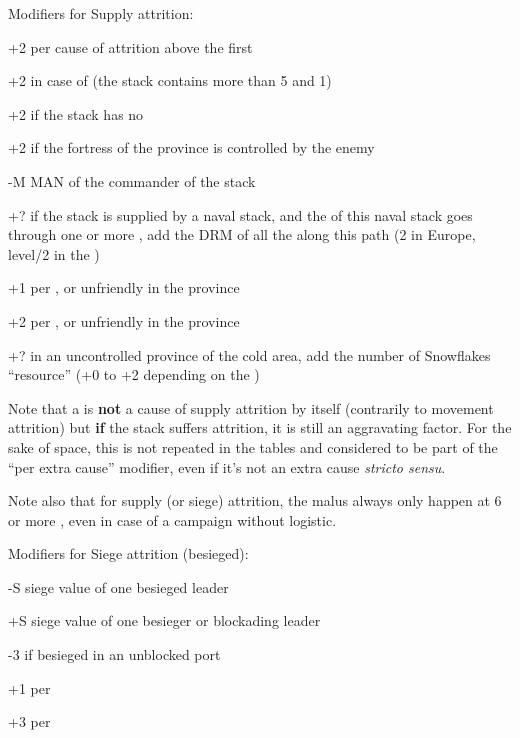 
Modifiers for Supply attrition:
\begin{modlist}
\item[+2] per cause of attrition above the first
\item[+2] in case of  (the stack contains more than 5\LD
  and 1\Pasha)
\item[+2] if the stack has no \LoS
\item[+2] if the fortress of the province is controlled by the enemy
\item[-M] MAN of the commander of the stack
\item[+?] if the stack is supplied by a naval stack, and the \LoS of this
  naval stack goes through one or more \StraitFort, add the DRM of all the
  \StraitFort along this path (2 in Europe, level/2 in the \ROTW)
\item[+1] per \PILLAGE\facemoins, \REVOLT\facemoins or unfriendly
  \REBELLION\facemoins in the province
\item[+2] per \PILLAGE\faceplus, \REVOLT\faceplus or unfriendly
  \REBELLION\faceplus in the province
\item[+?] in an uncontrolled province of the \ROTW cold area, add the number
  of Snowflakes ``resource'' (+0 to +2 depending on the \Area)
\end{modlist}

\begin{designnote}
  Note that a  is \textbf{not} a cause of supply attrition
  by itself (contrarily to movement attrition) but \textbf{if} the stack
  suffers attrition, it is still an aggravating factor. For the sake of space,
  this is not repeated in the tables and considered to be part of the ``per
  extra cause'' modifier, even if it's not an extra cause \emph{stricto
    sensu}.

  \smallskip

  Note also that for supply (or siege) attrition, the 
  malus always only happen at 6 or more \LD, even in case of a campaign
  without logistic.
\end{designnote}

Modifiers for Siege attrition (besieged):
\begin{modlist}
\item[-S] siege value of one besieged leader
\item[+S] siege value of one besieger or blockading leader
\item[-3] if besieged in an unblocked port
\item[+1] per \USURE\facemoins
\item[+3] per \USURE\faceplus
\end{modlist}

